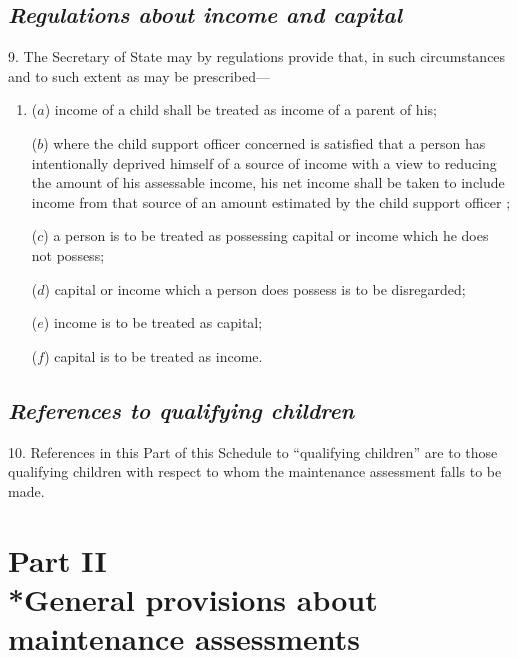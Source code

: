 \documentclass[12pt,a4paper]{article}
\begin{document}

\subsection*{\itshape Regulations about income and capital}

9. The Secretary of State may by regulations provide that, in such circumstances and to such extent as may be prescribed—
\begin{enumerate}\item[]
($a$) income of a child shall be treated as income of a parent of his;

($b$) where 
the child support officer concerned 
is satisfied that a person has intentionally deprived himself of a source of income with a view to reducing the amount of his assessable income, his net income shall be taken to include income from that source of an amount estimated by 
the child support officer%
;

($c$) a person is to be treated as possessing capital or income which he does not possess;

($d$) capital or income which a person does possess is to be disregarded;

($e$) income is to be treated as capital;

($f$) capital is to be treated as income.
\end{enumerate}


\subsection*{\itshape References to qualifying children}

10. References in this Part of this Schedule to “qualifying children” are to those qualifying children with respect to whom the maintenance assessment falls to be made.


\section[Part II --- General provisions about maintenance assessments]{Part II\\*General provisions about maintenance assessments}
\end{document}
